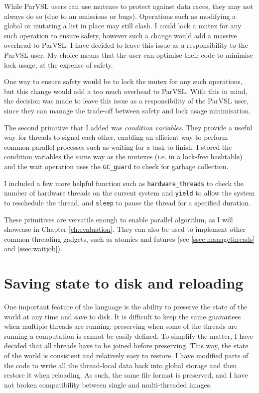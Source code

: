 While ParVSL users can use mutexes to protect against data races, they may not always do so
(due to an omissions or bugs). Operations such as modifying a global or mutating a list in place
may still clash.
I could lock a mutex for any such operation to ensure safety, however such a change would add a massive overhead to ParVSL.
I have decided to leave this issue as a responsibility to the ParVSL user.
My choice means that the user can optimise their code to minimise lock usage, at the expense of safety.

One way to ensure safety would be to lock the mutex for any such operations, but this change would add a
too much overhead to ParVSL. With this in mind, the decision was made to leave this issue as a responsibility
of the ParVSL user, since they can manage the trade-off between safety and lock usage minimisation.

The second primitive that I added was \emph{condition variables}. They provide a useful way for
threads to signal each other, enabling an efficient way to perform common parallel processes such as
waiting for a task to finish. I stored the condition variables the same way as the mutexes (i.e. in a lock-free
hashtable) and the wait operation uses the \verb|GC_guard| to check for garbage collection.

I included a few more helpful function such as \verb|hardware_threads| to check the number of hardware
threads on the current system and \verb|yield| to allow the system to reschedule the thread, and
\verb|sleep| to pause the thread for a specified duration.

These primitives are versatile enough to enable parallel algorithm, as I will showcase in Chapter \ref{ch:evaluation}.
They can also be used to implement other common threading gadgets, such as atomics and futures
(see \ref{ssec:managethreads} and \ref{ssec:waitjob}).


\section{Saving state to disk and reloading}
\label{sec:preserve}

One important feature of the language is the ability to preserve the state of the world at any
time and save to disk. It is difficult to keep the same guarantees when multiple threads are running:
preserving when some of the threads are running a computation is cannot be easily defined. To simplify the
matter, I have decided that all threads have to be joined before preserving. This way, the state of
the world is consistent and relatively easy to restore. I have modified parts of the code to write
all the thread-local data back into global storage and then restore it when reloading. As such, the same
file format is preserved, and I have not broken compatibility between single and multi-threaded images.

